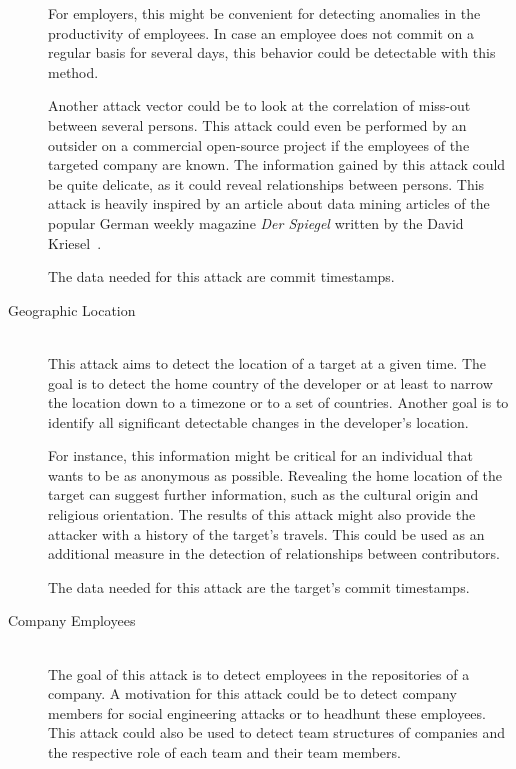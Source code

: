 \begin{description}
        For employers, this might be convenient for detecting anomalies in the productivity of employees.
        In case an employee does not commit on a regular basis for several days, this behavior could be detectable with this method.

        Another attack vector could be to look at the correlation of miss-out between several persons.
        This attack could even be performed by an outsider on a commercial open-source project if the employees of the targeted company are known.
        The information gained by this attack could be quite delicate, as it could reveal relationships between persons.
        This attack is heavily inspired by an article about data mining articles of the popular German weekly magazine \emph{Der Spiegel} written by the David Kriesel~\cite{article:spiegel-mining}.

        The data needed for this attack are commit timestamps.

    \item[Geographic Location]~\label{attack:geographic-location} \hfill \\
        This attack aims to detect the location of a target at a given time.
        The goal is to detect the home country of the developer or at least to narrow the location down to a timezone or to a set of countries.
        Another goal is to identify all significant detectable changes in the developer's location.

        For instance, this information might be critical for an individual that wants to be as anonymous as possible.
        Revealing the home location of the target can suggest further information, such as the cultural origin and religious orientation.
        The results of this attack might also provide the attacker with a history of the target's travels.
        This could be used as an additional measure in the detection of relationships between contributors.

        The data needed for this attack are the target's commit timestamps.

    \item[Company Employees]~\label{attack:company-employees} \hfill \\
        The goal of this attack is to detect employees in the repositories of a company.
        A motivation for this attack could be to detect company members for social engineering attacks or to headhunt these employees.
        This attack could also be used to detect team structures of companies and the respective role of each team and their team members.


\end{description}
